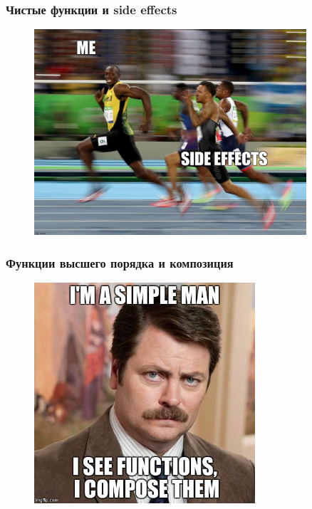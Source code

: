 \documentclass[18pt, compress, aspectratio=169]{beamer}
\begin{document}
\begin{frame}
    \frametitle{Чистые функции и side effects}
    \vspace{-20pt}
    \begin{figure}
        \includegraphics[width=0.9\textwidth,center]{side_effect.jpg}
    \end{figure}
\end{frame}

\begin{frame}
    \frametitle{Функции высшего порядка и композиция}
    \vspace{-25pt}
    \begin{figure}
        \includegraphics[width=0.73\textwidth,center]{function_composition.jpg}
    \end{figure}
\end{frame}
\end{document}
